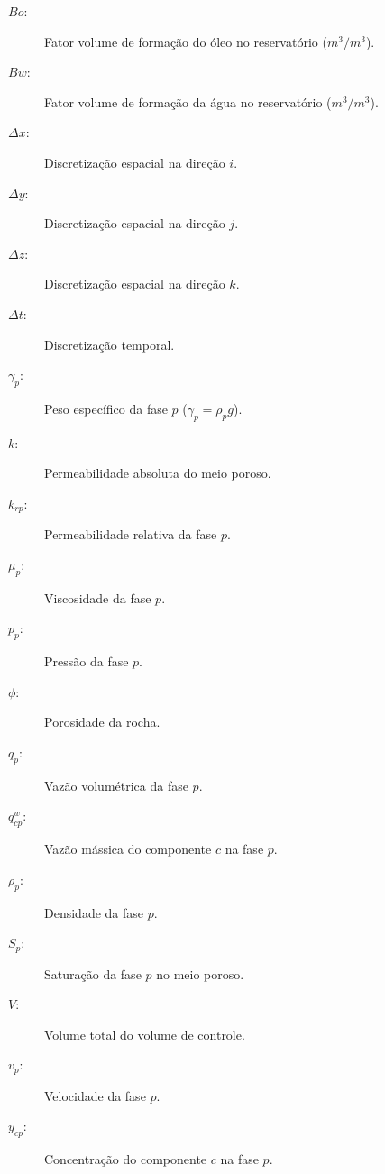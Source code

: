 \documentclass[final,5p]{elsarticle}
\numberwithin{equation}{section}
\begin{document}
\begin{description}
    \item[$Bo$:]Fator volume de formação do óleo no reservatório ($m^3/m^3$).
    \item[$Bw$:]Fator volume de formação da água no reservatório ($m^3/m^3$).
    \item[$\Delta x$:]Discretização espacial na direção $i$.
    \item[$\Delta y$:]Discretização espacial na direção $j$.
    \item[$\Delta z$:]Discretização espacial na direção $k$.
    \item[$\Delta t$:]Discretização temporal.
    \item[$\gamma_p$:]Peso específico da fase $p$ ($\gamma_p = \rho_p g$).
    \item[$k$:]Permeabilidade absoluta do meio poroso.
    \item[$k_{rp}$:]Permeabilidade relativa da fase $p$.
    \item[$\mu_p$:]Viscosidade da fase $p$.
    \item[$p_p$:]Pressão da fase $p$.
    \item[$\phi$:]Porosidade da rocha.
    \item[$q_p$:]Vazão volumétrica da fase $p$.
    \item[$q^w_{cp}$:]Vazão mássica do componente $c$ na fase $p$.
    \item[$\rho_p$:]Densidade da fase $p$.
    \item[$S_p$:]Saturação da fase $p$ no meio poroso.
    \item[$V$:]Volume total do volume de controle.
    \item[$v_p$:]Velocidade da fase $p$.
    \item[$y_{cp}$:]Concentração do componente $c$ na fase $p$.



\end{description}
\end{document}
